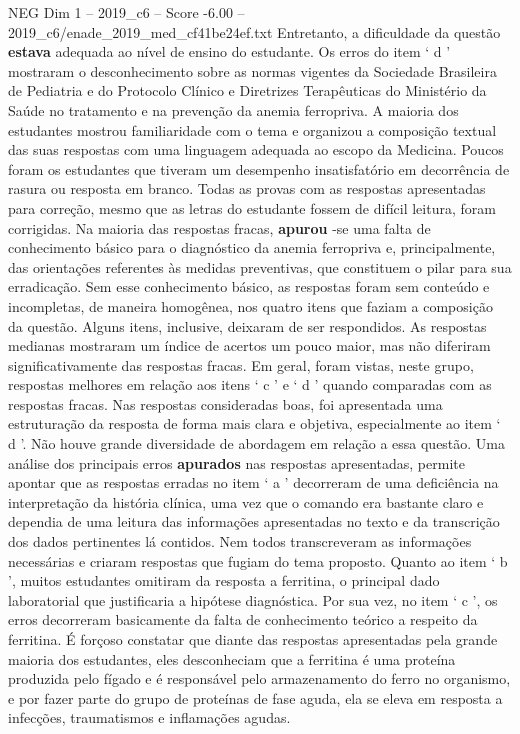\begin{textsample}{NEG Dim 1 – 2019\_c6 – Score -6.00 – 2019\_c6/enade\_2019\_med\_cf41be24ef.txt}
Entretanto, a dificuldade da questão \textbf{estava} adequada ao nível de ensino do estudante.
Os erros do item ‘ d ’ mostraram o desconhecimento sobre as normas vigentes da Sociedade Brasileira de Pediatria e do Protocolo Clínico e Diretrizes Terapêuticas do Ministério da Saúde no tratamento e na prevenção da anemia ferropriva.
A maioria dos estudantes mostrou familiaridade com o tema e organizou a composição textual das suas respostas com uma linguagem adequada ao escopo da Medicina.
Poucos foram os estudantes que tiveram um desempenho insatisfatório em decorrência de rasura ou resposta em branco.
Todas as provas com as respostas apresentadas para correção, mesmo que as letras do estudante fossem de difícil leitura, foram corrigidas.
Na maioria das respostas fracas, \textbf{apurou} -se uma falta de conhecimento básico para o diagnóstico da anemia ferropriva e, principalmente, das orientações referentes às medidas preventivas, que constituem o pilar para sua erradicação.
Sem esse conhecimento básico, as respostas foram sem conteúdo e incompletas, de maneira homogênea, nos quatro itens que faziam a composição da questão.
Alguns itens, inclusive, deixaram de ser respondidos.
As respostas medianas mostraram um índice de acertos um pouco maior, mas não diferiram significativamente das respostas fracas.
Em geral, foram vistas, neste grupo, respostas melhores em relação aos itens ‘ c ’ e ‘ d ’ quando comparadas com as respostas fracas.
Nas respostas consideradas boas, foi apresentada uma estruturação da resposta de forma mais clara e objetiva, especialmente ao item ‘ d ’.
Não houve grande diversidade de abordagem em relação a essa questão.
Uma análise dos principais erros \textbf{apurados} nas respostas apresentadas, permite apontar que as respostas erradas no item ‘ a ’ decorreram de uma deficiência na interpretação da história clínica, uma vez que o comando era bastante claro e dependia de uma leitura das informações apresentadas no texto e da transcrição dos dados pertinentes lá contidos.
Nem todos transcreveram as informações necessárias e criaram respostas que fugiam do tema proposto.
Quanto ao item ‘ b ’, muitos estudantes omitiram da resposta a ferritina, o principal dado laboratorial que justificaria a hipótese diagnóstica.
Por sua vez, no item ‘ c ’, os erros decorreram basicamente da falta de conhecimento teórico a respeito da ferritina.
É forçoso constatar que diante das respostas apresentadas pela grande maioria dos estudantes, eles desconheciam que a ferritina é uma proteína produzida pelo fígado e é responsável pelo armazenamento do ferro no organismo, e por fazer parte do grupo de proteínas de fase aguda, ela se eleva em resposta a infecções, traumatismos e inflamações agudas.

\end{textsample}
